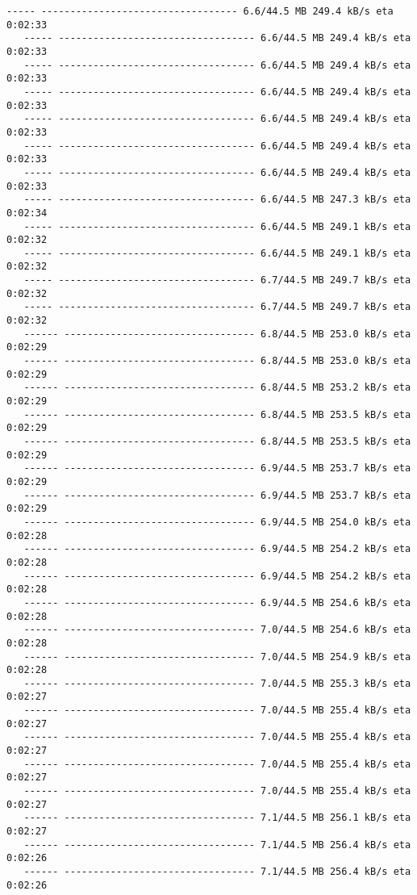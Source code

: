 \documentclass[11pt]{article}
\begin{document}
\begin{Verbatim}[commandchars=\\\{\}]
   ----- ---------------------------------- 6.6/44.5 MB 249.4 kB/s eta 0:02:33
   ----- ---------------------------------- 6.6/44.5 MB 249.4 kB/s eta 0:02:33
   ----- ---------------------------------- 6.6/44.5 MB 249.4 kB/s eta 0:02:33
   ----- ---------------------------------- 6.6/44.5 MB 249.4 kB/s eta 0:02:33
   ----- ---------------------------------- 6.6/44.5 MB 249.4 kB/s eta 0:02:33
   ----- ---------------------------------- 6.6/44.5 MB 249.4 kB/s eta 0:02:33
   ----- ---------------------------------- 6.6/44.5 MB 249.4 kB/s eta 0:02:33
   ----- ---------------------------------- 6.6/44.5 MB 247.3 kB/s eta 0:02:34
   ----- ---------------------------------- 6.6/44.5 MB 249.1 kB/s eta 0:02:32
   ----- ---------------------------------- 6.6/44.5 MB 249.1 kB/s eta 0:02:32
   ----- ---------------------------------- 6.7/44.5 MB 249.7 kB/s eta 0:02:32
   ----- ---------------------------------- 6.7/44.5 MB 249.7 kB/s eta 0:02:32
   ------ --------------------------------- 6.8/44.5 MB 253.0 kB/s eta 0:02:29
   ------ --------------------------------- 6.8/44.5 MB 253.0 kB/s eta 0:02:29
   ------ --------------------------------- 6.8/44.5 MB 253.2 kB/s eta 0:02:29
   ------ --------------------------------- 6.8/44.5 MB 253.5 kB/s eta 0:02:29
   ------ --------------------------------- 6.8/44.5 MB 253.5 kB/s eta 0:02:29
   ------ --------------------------------- 6.9/44.5 MB 253.7 kB/s eta 0:02:29
   ------ --------------------------------- 6.9/44.5 MB 253.7 kB/s eta 0:02:29
   ------ --------------------------------- 6.9/44.5 MB 254.0 kB/s eta 0:02:28
   ------ --------------------------------- 6.9/44.5 MB 254.2 kB/s eta 0:02:28
   ------ --------------------------------- 6.9/44.5 MB 254.2 kB/s eta 0:02:28
   ------ --------------------------------- 6.9/44.5 MB 254.6 kB/s eta 0:02:28
   ------ --------------------------------- 7.0/44.5 MB 254.6 kB/s eta 0:02:28
   ------ --------------------------------- 7.0/44.5 MB 254.9 kB/s eta 0:02:28
   ------ --------------------------------- 7.0/44.5 MB 255.3 kB/s eta 0:02:27
   ------ --------------------------------- 7.0/44.5 MB 255.4 kB/s eta 0:02:27
   ------ --------------------------------- 7.0/44.5 MB 255.4 kB/s eta 0:02:27
   ------ --------------------------------- 7.0/44.5 MB 255.4 kB/s eta 0:02:27
   ------ --------------------------------- 7.0/44.5 MB 255.4 kB/s eta 0:02:27
   ------ --------------------------------- 7.1/44.5 MB 256.1 kB/s eta 0:02:27
   ------ --------------------------------- 7.1/44.5 MB 256.4 kB/s eta 0:02:26
   ------ --------------------------------- 7.1/44.5 MB 256.4 kB/s eta 0:02:26

\end{Verbatim}
\end{document}
